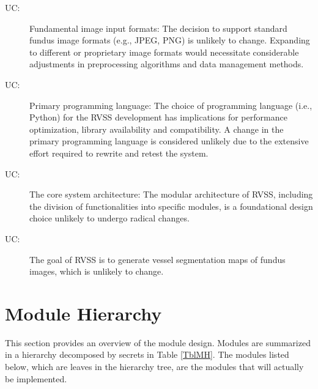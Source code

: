 \documentclass[12pt, titlepage]{article}
\newcounter{ucnum}
\newcommand{\uctheucnum}{UC\theucnum}
\begin{document}
\begin{description}
\item[ \uctheucnum \label{ucIO_1}:] Fundamental image input formats: The decision to support standard fundus image formats (e.g., JPEG, PNG) is unlikely to change. Expanding to different or proprietary image formats would necessitate considerable adjustments in preprocessing algorithms and data management methods.
\item[ \uctheucnum \label{ucInput_2}:] Primary programming language: The choice of programming language (i.e., Python) for the RVSS development has implications for performance optimization, library availability and compatibility. A change in the primary programming language is considered unlikely due to the extensive effort required to rewrite and retest the system.
\item[ \uctheucnum \label{ucOutput_3}:] The core system architecture: The modular architecture of RVSS, including the division of functionalities into specific modules, is a foundational design choice unlikely to undergo radical changes. 
\item[ \uctheucnum \label{ucEnergy_4}:] The goal of RVSS is to generate vessel segmentation maps of fundus images, which is unlikely to change.

\end{description}

\section{Module Hierarchy} \label{SecMH}

This section provides an overview of the module design. Modules are summarized
in a hierarchy decomposed by secrets in Table \ref{TblMH}. The modules listed
below, which are leaves in the hierarchy tree, are the modules that will
actually be implemented.
\end{document}

